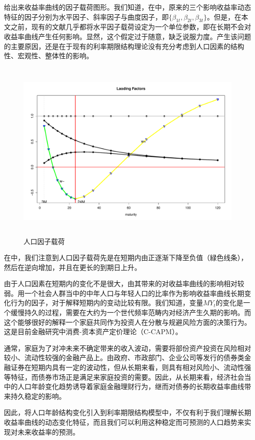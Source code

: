 给出来收益率曲线的因子载荷图形。我们知道，在\dns{}中，原来的三个影响收益率动态特征的因子分别为水平因子、斜率因子与曲度因子，即$\{\beta_{1t},\beta_{2t},\beta_{3t}\}$。但是，在本文之前，现有的文献几乎都将水平因子载荷设定为一个单位参数，即在长期不会对收益率曲线产生任何影响。显然，这个假定过于随意，缺乏说服力度。产生该问题的主要原因，还是在于现有的利率期限结构理论没有充分考虑到人口因素的结构性、宏观性、整体性的影响。
\begin{figure}\centering%
    \includegraphics[width=15cm,height=9cm]{figures/Rplot10}
   \caption{人口因子载荷}
   \label{Rplot10}
  \end{figure}
  
在中，我们注意到人口因子载荷先是在短期内由正逐渐下降至负值（緑色线条），然后在逆向增加，并且在更长的到期日上升。
\begin{compactitem}
 \item 由于人口因素在短期内的变化不是很大，由其带来的对收益率曲线的影响相对较弱。用一个社会人群当中的中年人口与年轻人口的比率作为影响收益率曲线长期变化行为的因子，对于解释短期内的变动比较有限。我们知道，变量$MY_t$的变化是一个缓慢持久的过程，需要在大约为一个世代频率范畴内对经济产生久期的影响。而这个能够很好的解释一个家庭共同作为投资人在分散与规避风险方面的决策行为。这是目前金融研究中消费-资本资产定价理论（C-CAPM）。
 \item 通常，家庭为了对冲未来不确定带来的收入波动，需要将部份资产投资在风险相对较小、流动性较强的金融产品上。由政府、市政部门、企业公司等发行的债券类金融证券在短期内具有一定的波动性，但从长期来看，则具有相对风险小、流动性强等特征，而债券市场正是满足来家庭投资的需要。因此，从长期来看，经济社会当中的人口年龄变化趋势诱导着家庭金融理财行为，继而对债券的长期收益率曲线带来持久稳定的影响。
 \item 因此，将人口年龄结构变化引入到利率期限结构模型中，不仅有利于我们理解长期收益率曲线的动态变化特征，而且我们可以利用这种稳定而可预测的人口趋势来实现对未来收益率的预测。
\end{compactitem}

